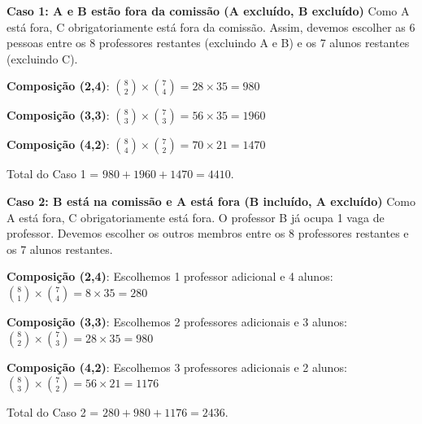 \documentclass[a4paper,10pt,landscape,twocolumn]{article}  %
\let\oldenumerate\enumerate
\let\oldendenumerate\endenumerate
\renewenvironment{enumerate}{%
  \oldenumerate%
  \setlength{\itemsep}{1pt}%
  \setlength{\parskip}{0pt}%
  \setlength{\parsep}{0pt}%
  \setlength{\topsep}{2pt}%
  \setlength{\partopsep}{0pt}%
}{%
  \oldendenumerate%
}
\let\olditemize\itemize
\let\oldenditemize\enditemize
\renewenvironment{itemize}{%
  \olditemize%
  \setlength{\itemsep}{1pt}%
  \setlength{\parskip}{0pt}%
  \setlength{\parsep}{0pt}%
  \setlength{\topsep}{2pt}%
  \setlength{\partopsep}{0pt}%
}{%
  \oldenditemize%
}
\begin{document}
\begin{enumerate}
    \textbf{Caso 1: A e B estão fora da comissão (A excluído, B excluído)}
    Como A está fora, C obrigatoriamente está fora da comissão.
    Assim, devemos escolher as 6 pessoas entre os 8 professores restantes (excluindo A e B) e os 7 alunos restantes (excluindo C).
    \begin{itemize}
        \item \textbf{Composição (2,4)}: $\binom{8}{2} \times \binom{7}{4} = 28 \times 35 = 980$
        \item \textbf{Composição (3,3)}: $\binom{8}{3} \times \binom{7}{3} = 56 \times 35 = 1960$
        \item \textbf{Composição (4,2)}: $\binom{8}{4} \times \binom{7}{2} = 70 \times 21 = 1470$
        \item Total do Caso 1 = $980 + 1960 + 1470 = 4410$.
    \end{itemize}

    \textbf{Caso 2: B está na comissão e A está fora (B incluído, A excluído)}
    Como A está fora, C obrigatoriamente está fora.
    O professor B já ocupa 1 vaga de professor. Devemos escolher os outros membros entre os 8 professores restantes e os 7 alunos restantes.
    \begin{itemize}
        \item \textbf{Composição (2,4)}: Escolhemos 1 professor adicional e 4 alunos: $\binom{8}{1} \times \binom{7}{4} = 8 \times 35 = 280$
        \item \textbf{Composição (3,3)}: Escolhemos 2 professores adicionais e 3 alunos: $\binom{8}{2} \times \binom{7}{3} = 28 \times 35 = 980$
        \item \textbf{Composição (4,2)}: Escolhemos 3 professores adicionais e 2 alunos: $\binom{8}{3} \times \binom{7}{2} = 56 \times 21 = 1176$
        \item Total do Caso 2 = $280 + 980 + 1176 = 2436$.
    \end{itemize}


\end{enumerate}
\end{document}
